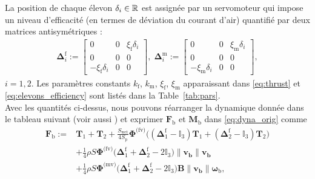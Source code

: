 La position de chaque élevon $\delta_i \in {\mathbb R}$ est assignée par un servomoteur qui impose un niveau d'efficacité (en termes de déviation du courant d'air) quantifié par deux matrices antisymétriques :
\begin{align}
\label{eq:elevons_efficiency}
    \boldsymbol{\Delta}^{\text{f}}_{i} \!:=\! \begin{bmatrix} 0 & 0 & \xi_{\text{f}}\delta_{i} \\ 0 & 0 & 0 \\ -\xi_{\text{f}}\delta_{i} & 0 & 0 \end{bmatrix}\! ,\;
    \boldsymbol{\Delta}^{\text{m}}_{i} \!:=\! \begin{bmatrix} 0 & 0 & \xi_{\text{m}}\delta_{i} \\ 0 & 0 & 0 \\ -\xi_{\text{m}}\delta_{i} & 0 & 0 \end{bmatrix} \!, 
\end{align}
$i=1,2$. Les paramètres constants $k_{\text{f}}$, $k_{\text{m}}$, $\xi_{\text{f}}$, $\xi_{\text{m}}$ apparaissant dans \eqref{eq:thrust} et \eqref{eq:elevons_efficiency} sont listés dans la Table~\ref{tab:pars}.\\
Avec les quantités ci-dessus, nous pouvons réarranger la dynamique donnée dans le tableau suivant \cite[eqns (97),~(98)]{lustosaHal-03035938} (voir aussi \cite{sansouStage}) et exprimer $\boldsymbol{F}_{\text{b}}$ et $\boldsymbol{M}_{\text{b}}$ dans \eqref{eq:dyna_orig} comme
%
\begin{align}
\nonumber
    \boldsymbol{F}_{\text{b}} :={}&  \boldsymbol{T}_{1} + \boldsymbol{T}_{2} + \frac{S_{\text{wet}}}{4S_{\text{p}}} \boldsymbol{\Phi}^{\text{(fv)}} \Big( (\boldsymbol{\Delta}^{\text{f}}_1 - \mathbb{I}_{3} ) \boldsymbol{T}_{1} + ( \boldsymbol{\Delta}^{\text{f}}_2 - \mathbb{I}_{3}) \boldsymbol{T}_{2}\Big) \\ 
     \label{eq:Fb}
    &+ \frac{1}{4} \rho S  \boldsymbol{\Phi}^{\text{(fv)}} \Big(\boldsymbol{\Delta}^{\text{f}}_1+ \boldsymbol{\Delta}^{\text{f}}_2 - 2 \mathbb{I}_{3} \Big) \lVert \boldsymbol{v_{\text{b}}} \rVert \boldsymbol{v_{\text{b}}}\\
    \nonumber
    &+ \frac{1}{4} \rho S \boldsymbol{\Phi}^{\text{(mv)}} \Big(\boldsymbol{\Delta}^{\text{f}}_1 + \boldsymbol{\Delta}^{\text{f}}_2 - 2\mathbb{I}_{3}\Big) \boldsymbol{B} \lVert \boldsymbol{v_{\text{b}}} \rVert  \boldsymbol{\omega}_{\text{b}}, 
\end{align}
